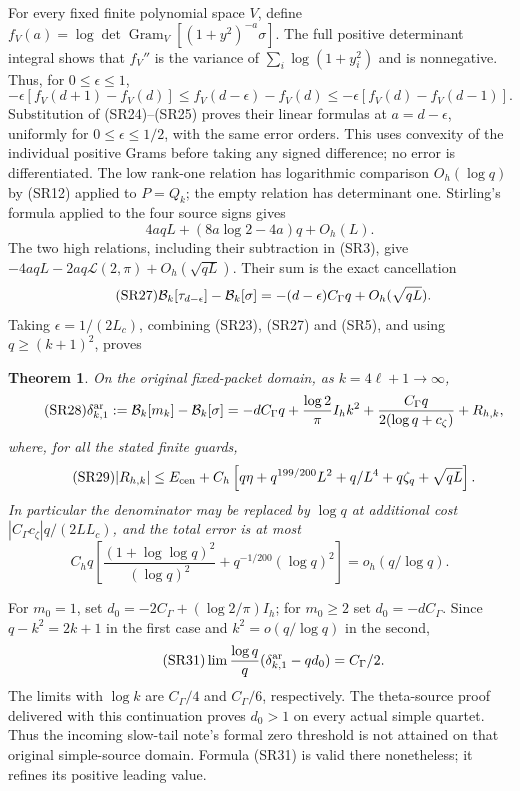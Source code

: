 \documentclass[11pt]{article}
\newtheorem{theorem}{Theorem}\newtheorem{lemma}[theorem]{Lemma}
\newcommand{\Gram}{\operatorname{Gram}}\newcommand{\rank}{\operatorname{rank}}
\begin{document}
For every fixed finite polynomial space $V$, define
$f_V(a)=\log\det\Gram_V[(1+y^2)^{-a}\sigma]$.
The full positive determinant integral shows that $f_V''$ is the variance of
$\sum_i\log(1+y_i^2)$ and is nonnegative. Thus, for $0\le\epsilon\le1$,
\begin{equation}\tag{SR26}
 -\epsilon[f_V(d+1)-f_V(d)]
 \le f_V(d-\epsilon)-f_V(d)
 \le-\epsilon[f_V(d)-f_V(d-1)].
\end{equation}
Substitution of (SR24)--(SR25) proves their linear formulas at
$a=d-\epsilon$, uniformly for $0\le\epsilon\le1/2$, with the same error
orders. This uses convexity of the individual positive Grams before taking
any signed difference; no error is differentiated.
The low rank-one relation has logarithmic comparison $O_h(\log q)$ by
(SR12) applied to $P=Q_k$; the empty relation has determinant one.
Stirling's formula \cite{DLMFGamma} applied to the four source signs gives
\[
 4aqL+(8a\log2-4a)q+O_h(L).
\]
The two high relations, including their subtraction in (SR3), give
$-4aqL-2aq\mathcal L(2,\pi)+O_h(\sqrt{qL})$.
Their sum is the exact cancellation
\begin{equation}\tag{SR27}
 \mathcal B_k[\tau_{d-\epsilon}]-\mathcal B_k[\sigma]
 =-(d-\epsilon)C_\Gamma q+O_h(\sqrt{qL}).
\end{equation}
Taking $\epsilon=1/(2L_c)$, combining (SR23), (SR27) and (SR5), and using
$q\ge(k+1)^2$, proves
\begin{theorem}
On the original fixed-packet domain, as $k=4\ell+1\to\infty$,
\begin{equation}\tag{SR28}
 \delta_{k,1}^{\rm ar}:=\mathcal B_k[m_k]-\mathcal B_k[\sigma]
 =-dC_\Gamma q+\frac{\log2}{\pi}I_hk^2
 +\frac{C_\Gamma q}{2(\log q+c_\zeta)}+R_{h,k},
\end{equation}
where, for all the stated finite guards,
\begin{equation}\tag{SR29}
 |R_{h,k}|\le E_{\rm cen}
 +C_h\left[q\eta+q^{199/200}L^2+q/L^4+q\zeta_q+\sqrt{qL}\right].
\end{equation}
In particular the denominator may be replaced by $\log q$ at additional
cost $|C_\Gamma c_\zeta|q/(2LL_c)$, and the total error is at most
\begin{equation}\tag{SR30}
 C_hq\left[\frac{(1+\log\log q)^2}{(\log q)^2}
                  +q^{-1/200}(\log q)^2\right]
 =o_h(q/\log q).
\end{equation}
\end{theorem}
For $m_0=1$, set $d_0=-2C_\Gamma+(\log2/\pi)I_h$; for $m_0\ge2$ set
$d_0=-dC_\Gamma$. Since $q-k^2=2k+1$ in the first case and
$k^2=o(q/\log q)$ in the second,
\begin{equation}\tag{SR31}
 \lim\frac{\log q}{q}(\delta_{k,1}^{\rm ar}-qd_0)=C_\Gamma/2.
\end{equation}
The limits with $\log k$ are $C_\Gamma/4$ and $C_\Gamma/6$, respectively.
The theta-source proof delivered with this continuation proves $d_0>1$ on
every actual simple quartet. Thus the incoming slow-tail note's formal zero
threshold is not attained on that original simple-source domain. Formula
(SR31) is valid there nonetheless; it refines its positive leading value.
\end{document}
